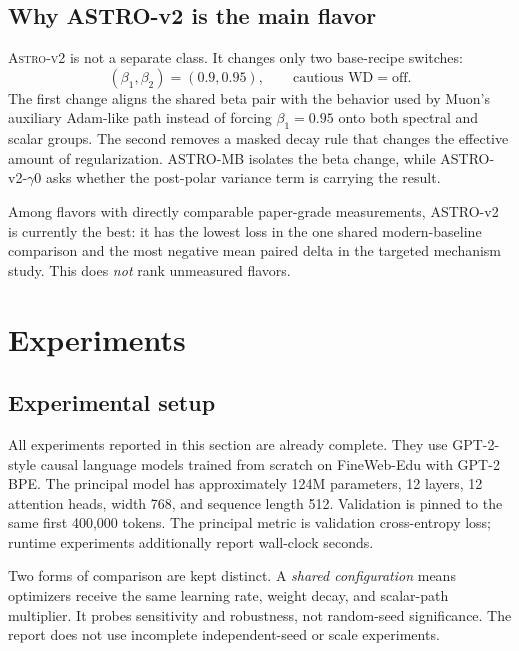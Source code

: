 \documentclass[10pt,twocolumn]{article}
\newcommand{\ASTROv}{\textsc{Astro-v2}\xspace}
\begin{document}
\subsection{Why ASTRO-v2 is the main flavor}

\ASTROv is not a separate class. It changes only two base-recipe switches:
\begin{equation}
(\beta_1,\beta_2)=(0.9,0.95), \qquad \text{cautious WD}=\text{off}.
\end{equation}
The first change aligns the shared beta pair with the behavior used by Muon's
auxiliary Adam-like path instead of forcing $\beta_1=0.95$ onto both spectral
and scalar groups. The second removes a masked decay rule that changes the
effective amount of regularization. ASTRO-MB isolates the beta change, while
ASTRO-v2-$\gamma0$ asks whether the post-polar variance term is carrying the
result.

Among flavors with directly comparable paper-grade measurements, ASTRO-v2 is
currently the best: it has the lowest loss in the one shared modern-baseline
comparison and the most negative mean paired delta in the targeted mechanism
study. This does \emph{not} rank unmeasured flavors.

\section{Experiments}\par\vspace{0.45em}

\subsection{Experimental setup}

All experiments reported in this section are already complete. They use
GPT-2-style causal language models trained from scratch on FineWeb-Edu with
GPT-2 BPE. The principal model has approximately 124M parameters, 12 layers, 12
attention heads, width 768, and sequence length 512. Validation is pinned to the
same first 400,000 tokens. The principal metric is validation cross-entropy
loss; runtime experiments additionally report wall-clock seconds.

Two forms of comparison are kept distinct. A \emph{shared configuration}
means optimizers receive the same learning rate, weight decay, and scalar-path
multiplier. It probes sensitivity and robustness, not random-seed significance.
The report does not use incomplete independent-seed or scale experiments.
\end{document}
